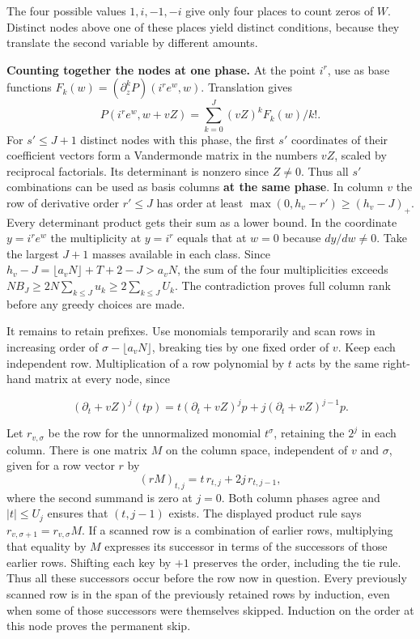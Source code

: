 \documentclass[11pt,a4paper]{article}
\begin{document}
The four possible values \(1,i,-1,-i\) give only four places to count zeros of \(W\). Distinct nodes above one of these places yield distinct conditions, because they translate the second variable by different amounts.

\textbf{Counting together the nodes at one phase.} At the point \(i^r\), use as base functions \(F_k(w)=(\partial_z^kP)(i^re^w,w)\). Translation gives \[
  P(i^re^w,w+vZ)=\sum_{k=0}^J (vZ)^kF_k(w)/k!.
\] For \(s'\le J+1\) distinct nodes with this phase, the first \(s'\) coordinates of their coefficient vectors form a Vandermonde matrix in the numbers \(vZ\), scaled by reciprocal factorials. Its determinant is nonzero since \(Z\ne0\). Thus all \(s'\) combinations can be used as basis columns \textbf{at the same phase}. In column \(v\) the row of derivative order \(r'\le J\) has order at least \(\max(0,h_v-r')\ge(h_v-J)_+\). Every determinant product gets their sum as a lower bound. In the coordinate \(y=i^re^w\) the multiplicity at \(y=i^r\) equals that at \(w=0\) because \(dy/dw\ne0\). Take the largest \(J+1\) masses available in each class. Since \(h_v-J=\lfloor a_vN\rfloor+T+2-J>a_vN\), the sum of the four multiplicities exceeds \(NB_J\ge2N\sum_{k\le J}u_k\ge2\sum_{k\le J}U_k\). The contradiction proves full column rank before any greedy choices are made.

It remains to retain prefixes. Use monomials temporarily and scan rows in increasing order of \(\sigma-\lfloor a_vN\rfloor\), breaking ties by one fixed order of \(v\). Keep each independent row. Multiplication of a row polynomial by \(t\) acts by the same right-hand matrix at every node, since

\[
 (\partial_t+vZ)^j(tp)=t(\partial_t+vZ)^jp+j(\partial_t+vZ)^{j-1}p .
\]

Let \(r_{v,\sigma}\) be the row for the unnormalized monomial \(t^\sigma\), retaining the \(2^j\) in each column. There is one matrix \(M\) on the column space, independent of \(v\) and \(\sigma\), given for a row vector \(r\) by \[
 (rM)_{t,j}=t\,r_{t,j}+2j\,r_{t,j-1},
\] where the second summand is zero at \(j=0\). Both column phases agree and \(|t|\le U_j\) ensures that \((t,j-1)\) exists. The displayed product rule says \(r_{v,\sigma+1}=r_{v,\sigma}M\). If a scanned row is a combination of earlier rows, multiplying that equality by \(M\) expresses its successor in terms of the successors of those earlier rows. Shifting each key by \(+1\) preserves the order, including the tie rule. Thus all these successors occur before the row now in question. Every previously scanned row is in the span of the previously retained rows by induction, even when some of those successors were themselves skipped. Induction on the order at this node proves the permanent skip.
\end{document}
